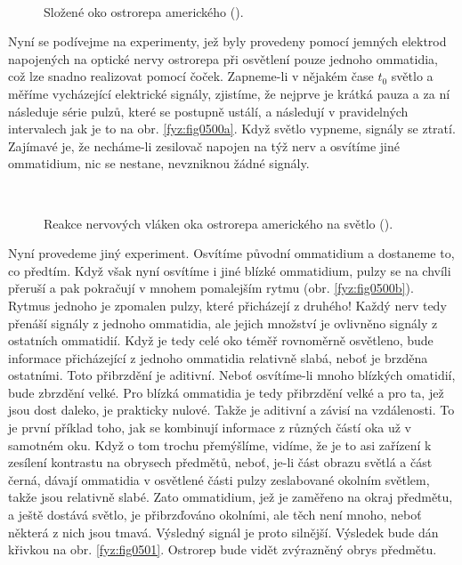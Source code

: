     \begin{figure}[hb!] %
      \centering
       \\
      \caption{Složené oko ostrorepa amerického (\cite[s.~601]{Feynman01}).}
      \label{fyz:fig0499}
    \end{figure}

    Nyní se podívejme na experimenty, jež byly provedeny pomocí jemných elektrod napojených na
    optické nervy ostrorepa při osvětlení pouze jednoho ommatidia, což lze snadno realizovat pomocí
    čoček. Zapneme-li v nějakém čase \(t_0\) světlo a měříme vycházející elektrické signály,
    zjistíme, že nejprve je krátká pauza a za ní následuje série pulzů, které se postupně ustálí, a
    následují v pravidelných intervalech jak je to na obr. \ref {fyz:fig0500a}. Když světlo vypneme,
    signály se ztratí. Zajímavé je, že necháme-li zesilovač napojen na týž nerv a osvítíme jiné
    ommatidium, nic se nestane, nevzniknou žádné signály.

    \begin{figure}[hb!] %
      \centering
        \\
      \caption{Reakce nervových vláken oka ostrorepa amerického na světlo (\cite[s.~601]{Feynman01}).}
      \label{fyz:fig0500}
    \end{figure}

    Nyní provedeme jiný experiment. Osvítíme původní ommatidium a dostaneme to, co předtím. Když
    však nyní osvítíme i jiné blízké ommatidium, pulzy se na chvíli přeruší a pak pokračují v mnohem
    pomalejším rytmu (obr. \ref{fyz:fig0500b}). Rytmus jednoho je zpomalen pulzy, které přicházejí z
    druhého! Každý nerv tedy přenáší signály z jednoho ommatidia, ale jejich množství je ovlivněno
    signály z ostatních ommatidií. Když je tedy celé oko téměř rovnoměrně osvětleno, bude informace
    přicházející z jednoho ommatidia relativně slabá, neboť je brzděna ostatními. Toto přibrzdění je
    aditivní. Neboť osvítíme-li mnoho blízkých omatidií, bude zbrzdění velké. Pro blízká ommatidia
    je tedy přibrzdění velké a pro ta, jež jsou dost daleko, je prakticky nulové. Takže je aditivní
    a závisí na vzdálenosti. To je první příklad toho, jak se kombinují informace z různých částí
    oka už v samotném oku. Když o tom trochu přemýšlíme, vidíme, že je to asi zařízení k zesílení
    kontrastu na obrysech předmětů, neboť, je-li část obrazu světlá a část černá, dávají ommatidia v
    osvětlené části pulzy zeslabované okolním světlem, takže jsou relativně slabé. Zato ommatidium,
    jež je zaměřeno na okraj předmětu, a ještě dostává světlo, je přibrzďováno okolními, ale těch
    není mnoho, neboť některá z nich jsou tmavá. Výsledný signál je proto silnější. Výsledek bude
    dán křivkou na obr. \ref{fyz:fig0501}. Ostrorep bude vidět zvýrazněný obrys předmětu.
    
